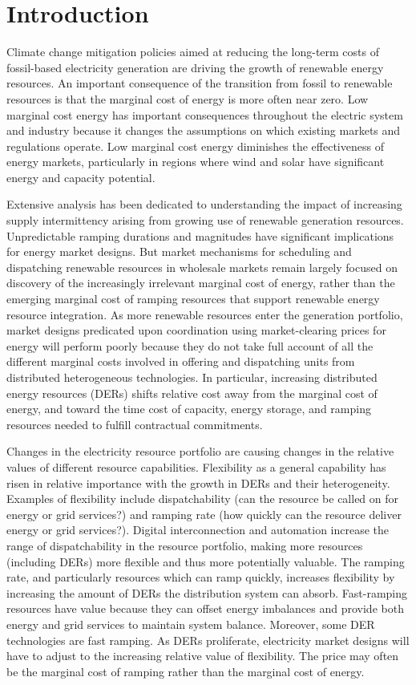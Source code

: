 \chapter{Introduction}

Climate change mitigation policies aimed at reducing the long-term costs of fossil-based electricity generation are driving the growth of renewable energy resources. An important consequence of the transition from fossil to renewable resources is that the marginal cost of energy is more often near zero. Low marginal cost energy has important consequences throughout the electric system and industry because it changes the assumptions on which existing markets and regulations operate. Low marginal cost energy diminishes the effectiveness of energy markets, particularly in regions where wind and solar have significant energy and capacity potential. 

Extensive analysis has been dedicated to understanding the impact of increasing supply intermittency arising from growing use of renewable generation resources. Unpredictable ramping durations and magnitudes have significant implications for energy market designs. But market mechanisms for scheduling and dispatching renewable resources in wholesale markets remain largely focused on discovery of the increasingly irrelevant marginal cost of energy, rather than the emerging marginal cost of ramping resources that support renewable energy resource integration. As more renewable resources enter the generation portfolio, market designs predicated upon coordination using market-clearing prices for energy will perform poorly because they do not take full account of all the different marginal costs involved in offering and dispatching units from distributed heterogeneous technologies. In particular, increasing distributed energy resources (DERs) shifts relative cost away from the marginal cost of energy, and toward the time cost of capacity, energy storage, and ramping resources needed to fulfill contractual commitments.

Changes in the electricity resource portfolio are causing changes in the relative values of different resource capabilities. Flexibility as a general capability has risen in relative importance with the growth in DERs and their heterogeneity. Examples of flexibility include dispatchability (can the resource be called on for energy or grid services?) and ramping rate (how quickly can the resource deliver energy or grid services?). Digital interconnection and automation increase the range of dispatchability in the resource portfolio, making more resources (including DERs) more flexible and thus more potentially valuable. The ramping rate, and particularly resources which can ramp quickly, increases flexibility by increasing the amount of DERs the distribution system can absorb. Fast-ramping resources have value because they can offset energy imbalances and provide both energy and grid services to maintain system balance. Moreover, some DER technologies are fast ramping. As DERs proliferate, electricity market designs will have to adjust to the increasing relative value of flexibility. The price may often be the marginal cost of ramping rather than the marginal cost of energy.

